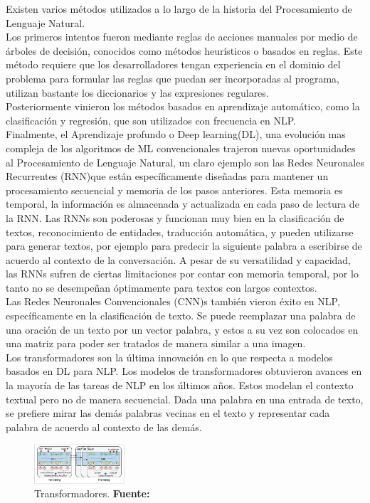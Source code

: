 Existen varios métodos utilizados a lo largo de la historia del Procesamiento de Lenguaje Natural.\\
Los primeros intentos fueron mediante reglas de acciones manuales por medio de árboles de decisión, conocidos como métodos heurísticos o basados en reglas. Este método requiere que los desarrolladores tengan experiencia en el dominio del problema para formular las reglas que puedan ser incorporadas al programa, utilizan bastante los diccionarios y las expresiones regulares.\\
\indent Posteriormente vinieron los métodos basados en aprendizaje automático, como la clasificación y regresión, que son utilizados con frecuencia en NLP.\\
\indent Finalmente, el Aprendizaje profundo o Deep learning(DL), una evolución mas compleja de los algoritmos de ML convencionales trajeron nuevas oportunidades al Procesamiento de Lenguaje Natural, un claro ejemplo son las Redes Neuronales Recurrentes (RNN)que están específicamente diseñadas para mantener un procesamiento secuencial y memoria de los pasos anteriores. Esta memoria es temporal, la información es almacenada y actualizada en cada paso de lectura de la RNN. Las RNNs son poderosas y funcionan muy bien en la clasificación de textos, reconocimiento de entidades, traducción automática, y pueden utilizarse para generar textos, por ejemplo para predecir la siguiente palabra a escribirse de acuerdo al contexto de la conversación. A pesar de su versatilidad y capacidad, las RNNs sufren de ciertas limitaciones por contar con memoria temporal, por lo tanto no se desempeñan óptimamente
para textos con largos contextos.\\
\indent Las Redes Neuronales Convencionales (CNN)s también vieron éxito en NLP, específicamente en la clasificación de texto. Se puede reemplazar una palabra de una oración de un texto por un vector palabra, y estos a su vez son colocados en una matriz para poder ser tratados de manera similar a una imagen.\\
\indent Los transformadores son la última innovación en lo que respecta a modelos basados en DL para NLP. Los modelos de transformadores obtuvieron avances en la mayoría de las tareas de NLP en los últimos años. Estos modelan el contexto textual pero no de manera secuencial. Dada una palabra en una entrada de texto, se prefiere mirar las demás palabras vecinas en el texto y representar cada palabra de acuerdo al contexto de las demás.
\begin{figure}[H]
\begin{centering}
\includegraphics[angle=0,width=0.3\textwidth]{Figuras/tranformers.png}
\par \end{centering}
\caption[Transformadores]{Transformadores. \textbf{Fuente:} \cite{sowmya_practical_npl}}
\label{NLP}
\end{figure}

